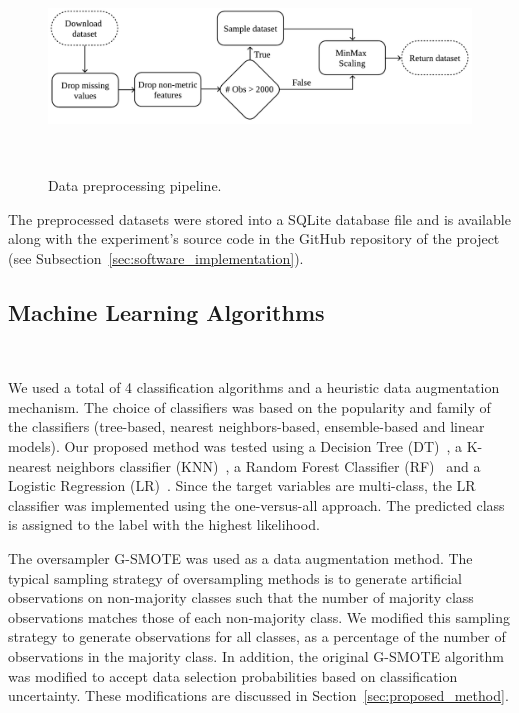 \documentclass[parskip=full]{scrartcl}
\begin{document}
\begin{figure}[H]
	\centering
	\includegraphics[width=1\linewidth]{../analysis/data_preprocessing}
    \caption{%
        Data preprocessing pipeline.
    }~\label{fig:data_preprocessing}
\end{figure}

The preprocessed datasets were stored into a SQLite database file and is
available along with the experiment's source code in the GitHub repository of
the project (see Subsection~\ref{sec:software_implementation}).

\subsection{Machine Learning Algorithms}~\label{sec:machine_learning_algorithms}

We used a total of 4 classification algorithms and a heuristic data
augmentation mechanism. The choice of classifiers was based on the popularity
and family of the classifiers (tree-based, nearest neighbors-based,
ensemble-based and linear models). Our proposed method was tested using a
Decision Tree (DT)~\cite{Wu1975}, a K-nearest neighbors classifier
(KNN)~\cite{Cover1967}, a Random Forest Classifier (RF)~\cite{Ho1995} and a
Logistic Regression (LR)~\cite{Nelder1972}. Since the target variables are
multi-class, the LR classifier was implemented using the one-versus-all
approach. The predicted class is assigned to the label with the highest
likelihood.

The oversampler G-SMOTE was used as a data augmentation method. The typical
sampling strategy of oversampling methods is to generate artificial
observations on non-majority classes such that the number of majority class
observations matches those of each non-majority class. We modified this
sampling strategy to generate observations for all classes, as a percentage of
the number of observations in the majority class. In addition, the original
G-SMOTE algorithm was modified to accept data selection probabilities based on
classification uncertainty. These modifications are discussed in
Section~\ref{sec:proposed_method}.
\end{document}

